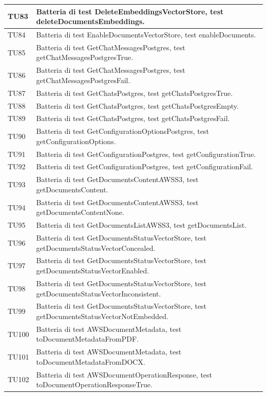 \documentclass[10pt, a4paper]{article}
\begin{document}
\begin{xltabular}{\textwidth}{p{0.12\textwidth}|X}
\hline
TU83 & Batteria di test DeleteEmbeddingsVectorStore, test deleteDocumentsEmbeddings. \\
\hline
TU84 & Batteria di test EnableDocumentsVectorStore, test enableDocuments. \\
\hline
TU85 & Batteria di test GetChatMessagesPostgres, test getChatMessagesPostgresTrue. \\
\hline
TU86 & Batteria di test GetChatMessagesPostgres, test getChatMessagesPostgresFail. \\
\hline
TU87 & Batteria di test GetChatsPostgres, test getChatsPostgresTrue. \\
\hline
TU88 & Batteria di test GetChatsPostgres, test getChatsPostgresEmpty. \\
\hline
TU89 & Batteria di test GetChatsPostgres, test getChatsPostgresFail. \\
\hline
TU90 & Batteria di test GetConfigurationOptionsPostgres, test getConfigurationOptions. \\
\hline
TU91 & Batteria di test GetConfigurationPostgres, test getConfigurationTrue. \\
\hline
TU92 & Batteria di test GetConfigurationPostgres, test getConfigurationFail. \\
\hline
TU93 & Batteria di test GetDocumentsContentAWSS3, test getDocumentsContent. \\
\hline
TU94 & Batteria di test GetDocumentsContentAWSS3, test getDocumentsContentNone. \\
\hline
TU95 & Batteria di test GetDocumentsListAWSS3, test getDocumentsList. \\
\hline
TU96 & Batteria di test GetDocumentsStatusVectorStore, test getDocumentsStatusVectorConcealed. \\
\hline
TU97 & Batteria di test GetDocumentsStatusVectorStore, test getDocumentsStatusVectorEnabled. \\
\hline
TU98 & Batteria di test GetDocumentsStatusVectorStore, test getDocumentsStatusVectorInconsistent. \\
\hline
TU99 & Batteria di test GetDocumentsStatusVectorStore, test getDocumentsStatusVectorNotEmbedded. \\
\hline
TU100 & Batteria di test AWSDocumentMetadata, test toDocumentMetadataFromPDF. \\
\hline
TU101 & Batteria di test AWSDocumentMetadata, test toDocumentMetadataFromDOCX. \\
\hline
TU102 & Batteria di test AWSDocumentOperationResponse, test toDocumentOperationResponseTrue. \\

\end{xltabular}
\end{document}
